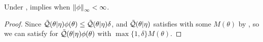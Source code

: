 \vspace{1em}

\begin{lem}
%
Under ,
 implies  when
$\left\Vert\phi\right\Vert_{\infty} < \infty$.

\begin{proof}
%
Since $\tilde{\mathcal{Q}}(\theta \vert \eta) \phi(\theta) \le \tilde{\mathcal{Q}}(\theta \vert \eta)
\delta$, and $\tilde{\mathcal{Q}}(\theta \vert \eta)$ satisfies  with
some $M(\theta)$ by , so we can satisfy
 for $\tilde{\mathcal{Q}}(\theta \vert \eta) \phi(\theta)$ with
$\max\{1, \delta\} M(\theta)$.
%
\end{proof}
%
\end{lem}

